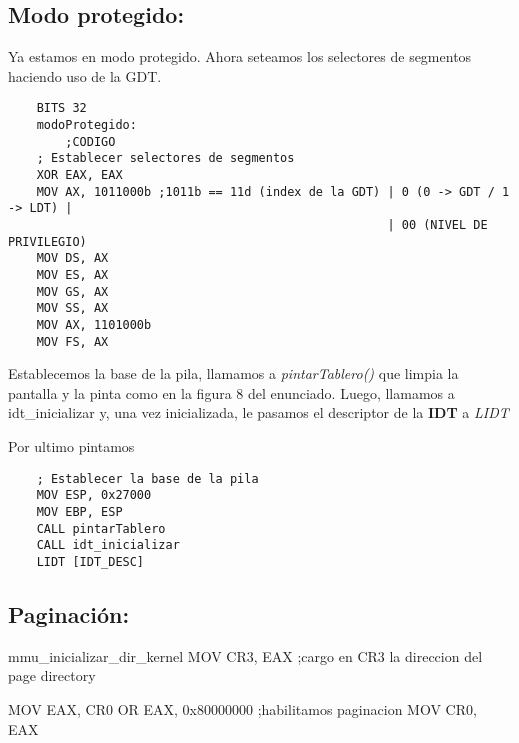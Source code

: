 \subsection{Modo protegido:}
Ya estamos en modo protegido. Ahora seteamos los selectores de segmentos haciendo uso de la GDT.

\begin{codesnippet}
\begin{verbatim}
    BITS 32
    modoProtegido:
        ;CODIGO
    ; Establecer selectores de segmentos
    XOR EAX, EAX
    MOV AX, 1011000b ;1011b == 11d (index de la GDT) | 0 (0 -> GDT / 1 -> LDT) |
	                                                 | 00 (NIVEL DE PRIVILEGIO)
    MOV DS, AX
    MOV ES, AX
    MOV GS, AX
    MOV SS, AX
    MOV AX, 1101000b
    MOV FS, AX
\end{verbatim}
\end{codesnippet}

Establecemos la base de la pila, llamamos a \textit{pintarTablero()} que limpia la pantalla y la pinta como en la figura 8 del enunciado. 
Luego, llamamos a idt_inicializar y, una vez inicializada, 
le pasamos el descriptor de la \textbf{IDT} a \textit{LIDT}

Por ultimo pintamos 

\begin{codesnippet}
\begin{verbatim}
    ; Establecer la base de la pila
    MOV ESP, 0x27000
    MOV EBP, ESP
    CALL pintarTablero
    CALL idt_inicializar
    LIDT [IDT_DESC]
\end{verbatim}
\end{codesnippet}

\subsection{Paginaci\'on:}

mmu_inicializar_dir_kernel
MOV CR3, EAX ;cargo en CR3 la direccion del page directory

MOV EAX, CR0
OR EAX, 0x80000000 ;habilitamos paginacion
MOV CR0, EAX


